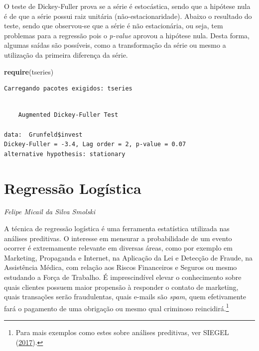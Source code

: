 \documentclass[12pt,brazil,oneside]{book}
\newenvironment{Shaded}{\begin{snugshade}}{\end{snugshade}}
\newcommand{\DataTypeTok}[1]{\textcolor[rgb]{0.13,0.29,0.53}{#1}}
\newcommand{\DecValTok}[1]{\textcolor[rgb]{0.00,0.00,0.81}{#1}}
\newcommand{\KeywordTok}[1]{\textcolor[rgb]{0.13,0.29,0.53}{\textbf{#1}}}
\newcommand{\NormalTok}[1]{#1}
\newcommand{\OperatorTok}[1]{\textcolor[rgb]{0.81,0.36,0.00}{\textbf{#1}}}
\let\rmarkdownfootnote\footnote%
\def\footnote{\protect\rmarkdownfootnote}
\begin{document}
O teste de Dickey-Fuller prova se a série é estocástica, sendo que a hipótese nula é de que a série possui raiz unitária (não-estacionaridade). Abaixo o resultado do teste, sendo que observou-se que a série é não estacionária, ou seja, tem problemas para a regressão pois o \emph{p-value} aprovou a hipótese nula. Desta forma, algumas saídas são possíveis, como a transformação da série ou mesmo a utilização da primeira diferença da série.

\begin{Shaded}
\begin{Highlighting}[]
\KeywordTok{require}\NormalTok{(tseries)}
\end{Highlighting}
\end{Shaded}

\begin{verbatim}
Carregando pacotes exigidos: tseries
\end{verbatim}

\begin{Shaded}
\end{Shaded}

\begin{verbatim}

    Augmented Dickey-Fuller Test

data:  Grunfeld$invest
Dickey-Fuller = -3.4, Lag order = 2, p-value = 0.07
alternative hypothesis: stationary
\end{verbatim}

\hypertarget{regressao-logistica}{%
\chapter{Regressão Logística}\label{regressao-logistica}}

\emph{Felipe Micail da Silva Smolski}

\begin{flushright}
\emph{}
\end{flushright}

A técnica de regressão logística é uma ferramenta estatística utilizada nas análises preditivas. O interesse em mensurar a probabilidade de um evento ocorrer é extremamente relevante em diversas áreas, como por exemplo em Marketing, Propaganda e Internet, na Aplicação da Lei e Detecção de Fraude, na Assistência Médica, com relação aos Riscos Financeiros e Seguros ou mesmo estudando a Força de Trabalho. É imprescindível elevar o conhecimento sobre quais clientes possuem maior propensão à responder o contato de marketing, quais transações serão fraudulentas, quais e-mails são \emph{spam}, quem efetivamente fará o pagamento de uma obrigação ou mesmo qual criminoso reincidirá.\footnote{Para mais exemplos como estes sobre análises preditivas, ver SIEGEL (\protect\hyperlink{ref-Siegel2017}{2017}).}
\end{document}
